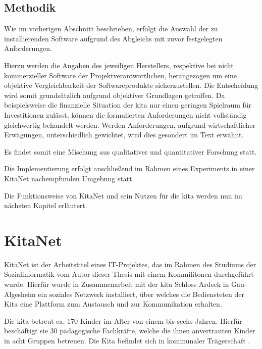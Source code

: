 \section{Methodik}

Wie im vorherigen Abschnitt beschrieben, erfolgt die Auswahl der zu installierenden Software aufgrund des Abgleichs mit zuvor festgelegten Anforderungen.

Hierzu werden die Angaben des jeweiligen Herstellers, respektive bei nicht kommerzieller Software der Projektverantwortlichen, herangezogen um eine objektive Vergleichbarkeit der Softwareprodukte sicherzustellen. Die Entscheidung wird somit grundsätzlich aufgrund objektiver Grundlagen getroffen.  Da beispielsweise die finanzielle Situation der \ac{kita} nur einen geringen Spielraum für Investitionen zulässt, können die formulierten Anforderungen nicht vollständig gleichwertig behandelt werden. Werden Anforderungen, \zb aufgrund wirtschaftlicher Erwägungen, unterschiedlich gewichtet, wird dies gesondert im Text erwähnt.

Es findet somit eine Mischung aus qualitativer und quantitativer Forschung statt.

Die Implementierung erfolgt anschließend im Rahmen eines Experiments in einer KitaNet nachempfunden Umgebung statt.

Die Funktionsweise von KitaNet und sein Nutzen für die \ac{kita} werden nun im nächsten Kapitel erläutert.

\chapter{KitaNet}
\label{sec:KitaNet}

KitaNet ist der Arbeitstitel eines IT-Projektes, das im Rahmen des Studiums der Sozialinformatik vom Autor dieser Thesis mit einem Kommilitonen durchgeführt wurde. Hierfür wurde in Zusammenarbeit mit der \ac{kita} Schloss Ardeck in Gau-Algesheim ein soziales Netzwerk installiert, über welches die Bediensteten der Kita eine Plattform zum Austausch und zur Kommunikation erhalten. 

Die \ac{kita} betreut ca. 170 Kinder im Alter von einem bis sechs Jahren. Hierfür beschäftigt sie 30 pädagogische Fachkräfte, welche die ihnen anvertrauten Kinder in acht Gruppen betreuen. Die Kita befindet sich in kommunaler Trägerschaft \citep[vgl.][]{kitaweb}.

